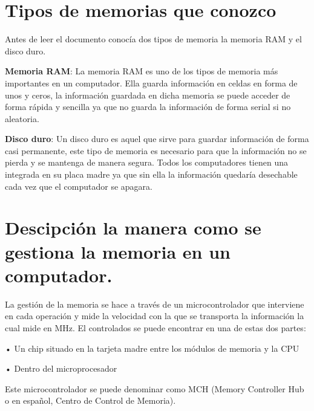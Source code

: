 \documentclass{article}
\begin{document}
\section{Tipos de memorias que conozco} \label{contenido}
        \vspace{0.8cm}
Antes de leer el documento conocía dos tipos de memoria la memoria RAM y el disco duro.
        \vspace{0.8cm}
        
\textbf{Memoria RAM}: La memoria RAM es uno de los tipos de memoria más importantes en un computador. Ella guarda información en celdas en forma de unos y ceros, la información guardada en dicha memoria se puede acceder de forma rápida y sencilla ya que no guarda la información de forma serial si no aleatoria.\cite{sistema}
        \vspace{0.8cm} 
        
\textbf{Disco duro}: Un disco duro es aquel que sirve para guardar información de forma casi permanente, este tipo de memoria es necesario para que la información no se pierda y se mantenga de manera segura. Todos los computadores tienen una integrada en su placa madre ya que sin ella la información quedaría desechable cada vez que el computador se apagara. \cite{Disco_Duro}

\section{Descipción la manera como se gestiona la memoria en un computador.}
        \vspace{0.8cm}
La gestión de la memoria se hace a través de un microcontrolador que interviene en cada operación y mide la velocidad con la que se transporta la información la cual mide en MHz. El controlados se puede encontrar en una de estas dos partes:

        \vspace{0.8cm}
•	 Un chip situado en la tarjeta madre entre los módulos de memoria y la CPU

        \vspace{0.5cm}
•	Dentro del microprocesador 

        \vspace{0.8cm}
Este microcontrolador se puede denominar como MCH (Memory Controller Hub o en español, Centro de Control de Memoria).
\end{document}
